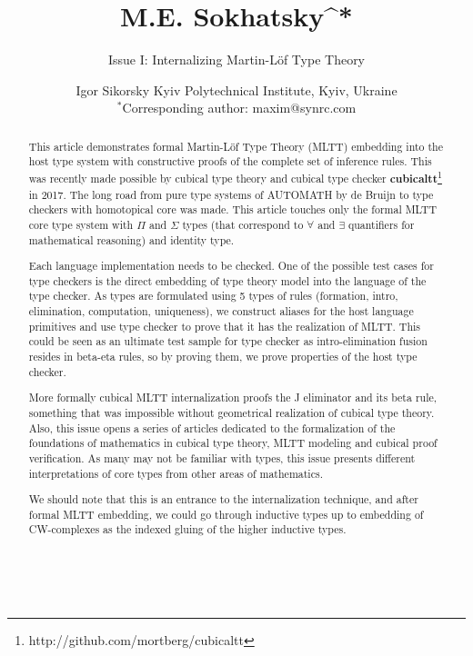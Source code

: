 \documentclass{article}
\theoremstyle{definition}
\begin{document}
\title{\small M.E. Sokhatsky^{*}}
\author{Issue I: Internalizing Martin-Löf Type Theory}
\date{ \small Igor Sikorsky Kyiv Polytechnical Institute, Kyiv, Ukraine\\
       \small $^*$Corresponding author: maxim@synrc.com}

\maketitle

\begin{abstract}

This article demonstrates formal Martin-Löf Type Theory (MLTT)
embedding into the host type system with constructive proofs
of the complete set of inference rules. This was recently made
possible by cubical type theory and cubical type
checker {\bf cubicaltt}\footnote{http://github.com/mortberg/cubicaltt} in 2017.
The long road from pure type systems of AUTOMATH by de Bruijn to type
checkers with homotopical core was made. This article touches only
the formal MLTT core type system with $\Pi$ and $\Sigma$ types (that correspond
to $\forall$ and $\exists$ quantifiers for mathematical reasoning) and identity type.

Each language implementation needs to be checked. One of the possible
test cases for type checkers is the direct embedding of type theory
model into the language of the type checker. As types are formulated
using 5 types of rules (formation, intro, elimination,
computation, uniqueness), we construct aliases for the host
language primitives and use type checker to prove that it has
the realization of MLTT. This could be seen as an ultimate test
sample for type checker as intro-elimination fusion resides in
beta-eta rules, so by proving them, we prove properties of the
host type checker.

More formally cubical MLTT internalization proofs the J eliminator
and its beta rule, something that was impossible without geometrical
realization of cubical type theory. Also, this issue opens a series
of articles dedicated to the formalization of the foundations
of mathematics in cubical type theory, MLTT modeling and cubical
proof verification. As many may not be familiar with  types,
this issue presents different interpretations of core types from
other areas of mathematics.

We should note that this is an entrance to the internalization
technique, and after formal MLTT embedding, we could go through
inductive types up to embedding of CW-complexes as the indexed
gluing of the higher inductive types.
\\
\\
\\
\end{abstract}
\end{document}
